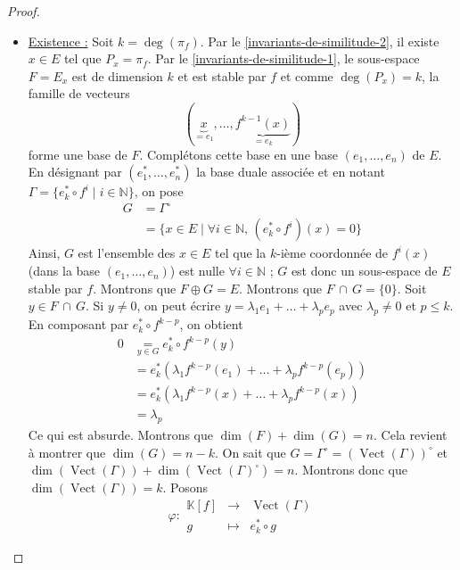   \begin{proof}
    \begin{itemize}
      \item \uline{Existence :} Soit $k = \deg(\pi_f)$. Par le \cref{invariants-de-similitude-2}, il existe $x \in E$ tel que $P_x = \pi_f$. Par le \cref{invariants-de-similitude-1}, le sous-espace $F = E_x$ est de dimension $k$ et est stable par $f$ et comme $\deg(P_x) = k$, la famille de vecteurs
      \[ (\underbrace{x}_{= e_1}, \dots, \underbrace{f^{k-1}(x)}_{= e_k}) \]
      forme une base de $F$. Complétons cette base en une base $(e_1, \dots, e_n)$ de $E$. En désignant par $(e_1^*, \dots, e_n^*)$ la base duale associée et en notant $\Gamma = \{ e_k^* \circ f^i \mid i \in \mathbb{N} \}$, on pose
      \begin{align*}
        G &= \Gamma^\circ \\
        &= \{ x \in E \mid \forall i \in \mathbb{N}, \, (e_k^* \circ f^i)(x) = 0 \}
      \end{align*}
      Ainsi, $G$ est l'ensemble des $x \in E$ tel que la $k$-ième coordonnée de $f^i(x)$ (dans la base $(e_1, \dots, e_n)$)  est nulle $\forall i \in \mathbb{N}$ ; $G$ est donc un sous-espace de $E$ stable par $f$. Montrons que $F \oplus G = E$.
      \newpar
      Montrons que $F \, \cap \, G = \{ 0 \}$. Soit $y \in F \, \cap \, G$. Si $y \neq 0$, on peut écrire $y = \lambda_1 e_1 + \dots + \lambda_p e_p$ avec $\lambda_p \neq 0$ et $p \leq k$. En composant par $e_k^* \circ f^{k-p}$, on obtient
      \begin{align*}
        0 &\underset{y \in G}{=} e_k^* \circ f^{k-p}(y) \\
        &= e_k^* (\lambda_1 f^{k-p}(e_1) + \dots + \lambda_p f^{k-p}(e_p)) \\
        &= e_k^* (\lambda_1 f^{k-p}(x) + \dots + \lambda_p f^{k-p}(x)) \\
        &= \lambda_p
      \end{align*}
      Ce qui est absurde.
      \newpar
      Montrons que $\dim(F) + \dim(G) = n$. Cela revient à montrer que $\dim(G) = n - k$. On sait que $G = \Gamma^\circ = (\operatorname{Vect}(\Gamma))^\circ$ et $\dim(\operatorname{Vect}(\Gamma)) + \dim(\operatorname{Vect}(\Gamma)^\circ) = n$. Montrons donc que $\dim(\operatorname{Vect}(\Gamma)) = k$. Posons
      \[
      \varphi :
      \begin{array}{ccc}
        \mathbb{K}[f] &\rightarrow& \operatorname{Vect}(\Gamma) \\
        g &\mapsto& e_k^* \circ g
      \end{array}
\]
\end{itemize}
\end{proof}
